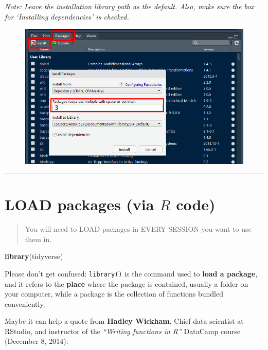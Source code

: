 \documentclass[]{book}
\newenvironment{Shaded}{\begin{snugshade}}{\end{snugshade}}
\newcommand{\KeywordTok}[1]{\textcolor[rgb]{0.13,0.29,0.53}{\textbf{#1}}}
\newcommand{\NormalTok}[1]{#1}
\theoremstyle{definition}
\theoremstyle{definition}
\theoremstyle{definition}
\theoremstyle{remark}
\begin{document}
\emph{Note: Leave the installation library path as the default. Also,
make sure the box for `Installing dependencies' is checked.}

\begin{figure}
\centering
\includegraphics{img/Install_Package_Screenshot.png}
\caption{}
\end{figure}

\begin{center}\rule{0.5\linewidth}{\linethickness}\end{center}

\section{\texorpdfstring{LOAD packages (via \(R\)
code)}{LOAD packages (via R code)}}\label{load-packages-via-r-code}

\begin{quote}
You will need to LOAD packages in EVERY SESSION you want to use them in.
\end{quote}

\begin{Shaded}
\begin{Highlighting}[]
\KeywordTok{library}\NormalTok{(tidyverse)}
\end{Highlighting}
\end{Shaded}

Please don't get confused: \texttt{library()} is the command used to
\textbf{load a package}, and it refers to the \textbf{place} where the
package is contained, usually a folder on your computer, while a package
is the collection of functions bundled conveniently.

Maybe it can help a quote from \textbf{Hadley Wickham}, Chief data
scientist at RStudio, and instructor of the \emph{``Writing functions in
R''} DataCamp course (December 8, 2014):
\end{document}
